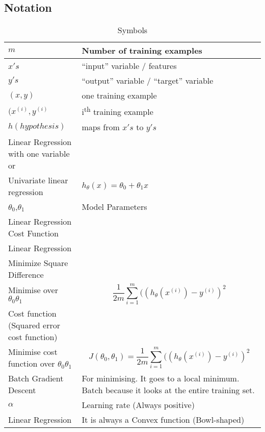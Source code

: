 \documentclass[a4paper]{report}
\begin{document}
\subsection{Notation}
\label{sec:notation}
\begin{table}[h!]
  \centering
  \begin{tabularx}{\textwidth}{l|X}
    $m$ & Number of training examples \\\hline
    $x's$ & ``input'' variable / features \\\hline
    $y's$ & ``output'' variable / ``target'' variable \\\hline
    $(x,y)$ & one training example \\\hline
    $(x^{(i)},y^{(i)}$ & i\textsuperscript{th} training example \\\hline
    $h(hypothesis)$ & maps from $x's$ to $y's$ \\\hline
    Linear Regression with one variable or \\ Univariate linear regression & $h_\theta(x)=\theta_0 + \theta_1x$ \\\hline
    $\theta_0$,$\theta_1$ & Model Parameters \\\hline
    Linear Regression Cost Function & \\\hline
    Linear Regression\\Minimize Square Difference\\Minimise over $\theta_0 \theta_1$ & $$\dfrac{1}{2m}\sum_{i=1}^m((h_\theta(x^({i}))-y^{(i)})^2$$\\\hline
    Cost function (Squared error cost function)\\ Minimise cost function over $\theta_0 \theta_1$ & $$J(\theta_0,\theta_1)=\dfrac{1}{2m}\sum_{i=1}^m((h_\theta(x^({i}))-y^{(i)})^2$$ \\\hline
   Batch Gradient Descent & For minimising. It goes to a local minimum. Batch because it looks at the entire training set. \\\hline
  $\alpha$ & Learning rate (Always positive)\\\hline 
    Linear Regression & It is always a Convex function (Bowl-shaped) \\\hline
  \end{tabularx}
  \caption{Symbols}
  \label{tab:symbols}
\end{table}
\end{document}
